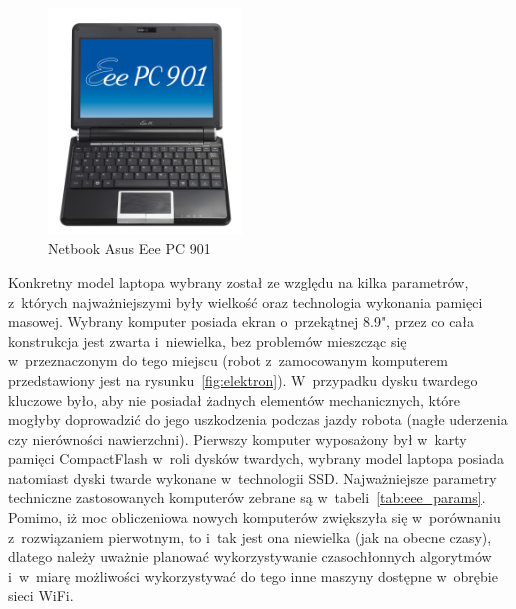 \begin{figure}[h!]
\centering
\includegraphics[height=6cm]{../img/eee}
\caption{Netbook Asus Eee PC 901}
\label{fig:eee}
\end{figure}

Konkretny model laptopa wybrany został ze względu na kilka parametrów, z~których
najważniejszymi były wielkość oraz technologia wykonania pamięci masowej. Wybrany
komputer posiada ekran o~przekątnej 8.9", przez co cała konstrukcja jest zwarta
i~niewielka, bez problemów mieszcząc się w~przeznaczonym do tego miejscu (robot
z~zamocowanym komputerem przedstawiony jest na rysunku~\ref{fig:elektron}). W~przypadku
dysku twardego kluczowe było, aby nie posiadał żadnych elementów mechanicznych,
które mogłyby doprowadzić do jego uszkodzenia podczas jazdy robota (nagłe uderzenia
czy nierówności nawierzchni). Pierwszy komputer wyposażony był w~karty pamięci
CompactFlash w~roli dysków twardych, wybrany model laptopa posiada natomiast
dyski twarde wykonane w~technologii SSD. Najważniejsze parametry techniczne
zastosowanych komputerów zebrane są w~tabeli~\ref{tab:eee_params}.
Pomimo, iż moc obliczeniowa nowych komputerów zwiększyła się w~porównaniu
z~rozwiązaniem pierwotnym, to i~tak jest ona niewielka (jak na obecne czasy),
dlatego należy uważnie planować wykorzystywanie czasochłonnych algorytmów
i~w~miarę możliwości wykorzystywać do tego inne maszyny dostępne w~obrębie sieci
WiFi.

